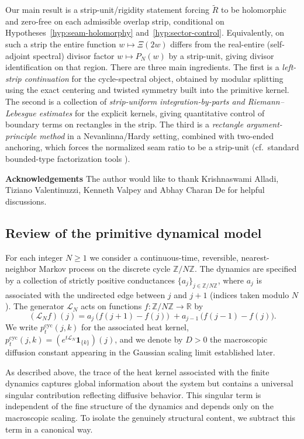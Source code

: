 \documentclass[11pt]{amsart}
\theoremstyle{definition}
\theoremstyle{remark}
\newcommand{\Z}{\mathbb{Z}}
\newcommand{\R}{\mathbb{R}}
\begin{document}
Our main result is a strip-unit/rigidity statement forcing $\widetilde R$ to be holomorphic and zero-free on each admissible overlap strip, conditional on Hypotheses~\ref{hyp:seam-holomorphy} and~\ref{hyp:sector-control}. Equivalently, on such a strip the entire function $w\mapsto \Xi(2w)$ differs from the real-entire (self-adjoint spectral) divisor factor $w\mapsto P_N(w)$ by a strip-unit, giving divisor identification on that region.
There are three main ingredients. The first is a \emph{left-strip continuation} for the cycle-spectral
object, obtained by modular splitting using the exact centering and twisted symmetry built into
the primitive kernel. The second is a collection of \emph{strip-uniform integration-by-parts and
Riemann--Lebesgue estimates} for the explicit kernels, giving quantitative control of boundary
terms on rectangles in the strip. The third is a \emph{rectangle argument-principle method} in a
Nevanlinna/Hardy setting, combined with two-ended anchoring, which forces the normalized seam ratio
to be a strip-unit (cf.\ standard bounded-type factorization tools \cite{Koosis1998}).

\textbf{Acknowledgements}
The author would like to thank Krishnaswami Alladi, Tiziano Valentinuzzi, Kenneth Valpey and Abhay Charan De for helpful discussions.


\subsection{Review of the primitive dynamical model}
\label{sec:model}

For each integer $N\ge 1$ we consider a continuous-time, reversible, nearest-neighbor Markov
process on the discrete cycle $\Z/N\Z$. The dynamics are specified by a collection of strictly
positive conductances $\{a_j\}_{j\in\Z/N\Z}$, where $a_j$ is associated with the undirected edge
between $j$ and $j+1$ (indices taken modulo $N$). The generator $\mathcal{L}_N$ acts on functions
$f:\Z/N\Z\to\R$ by
\begin{equation}
\label{eq:generator}
(\mathcal{L}_N f)(j)
=
a_j\,\bigl(f(j+1)-f(j)\bigr)
\;+
a_{j-1}\,\bigl(f(j-1)-f(j)\bigr).
\end{equation}
We write $p^{\mathrm{cyc}}_t(j,k)$ for the associated heat kernel,
\(p^{\mathrm{cyc}}_t(j,k)=(e^{t\mathcal{L}_N}\mathbf{1}_{\{k\}})(j)\), and we denote by $D>0$ the
macroscopic diffusion constant appearing in the Gaussian scaling limit established later.

As described above, the trace of the heat kernel associated with the finite dynamics captures
global information about the system but contains a universal singular contribution reflecting
diffusive behavior. This singular term is independent of the fine structure of the dynamics and
depends only on the macroscopic scaling. To isolate the genuinely structural content, we
subtract this term in a canonical way.
\end{document}
